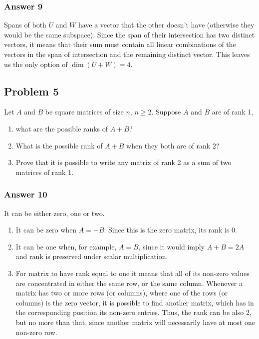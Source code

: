 \documentclass[11pt]{article}
\begin{document}
\subsubsection{Answer 9}
\label{sec-1-4-1}
Spans of both $U$ and $W$ have a vector that the other doesn't have
(otherwise they would be the same subspace).  Since the span of their
intersection has two distinct vectors, it means that their sum must contain
all linear combinations of the vectors in the span of intersection and the
remaining distinct vector.  This leaves us the only option of $\dim(U+W) =
    4$.

\subsection{Problem 5}
\label{sec-1-5}
Let $A$ and $B$ be square matrices of size $n$, $n \geq 2$.  Suppose $A$ and
$B$ are of rank 1, 
\begin{enumerate}
\item what are the possible ranks of $A + B$?
\item What is the possible rank of $A + B$ when they both are of rank 2?
\item Prove that it is possible to write any matrix of rank 2 as a sum of
two matrices of rank 1.
\end{enumerate}

\subsubsection{Answer 10}
\label{sec-1-5-1}
It can be either zero, one or two.
\begin{enumerate}
\item It can be zero when $A = -B$.  Since this is the zero matrix, its rank is 0.
\item It can be one when, for example, $A = B$, since it would imply $A + B =
       2A$ and rank is preserved under scalar multiplication.
\item For matrix to have rank equal to one it means that all of its non-zero
values are concentrated in either the same row, or the same column.
Whenever a matrix has two or more rows (or columns), where one of the
rows (or columns) is the zero vector, it is possible to find another
matrix, which has in the corresponding position its non-zero entries.
Thus, the rank can be also 2, but no more than that, since another matrix
will necessarily have at most one non-zero row.
\end{enumerate}
\end{document}

